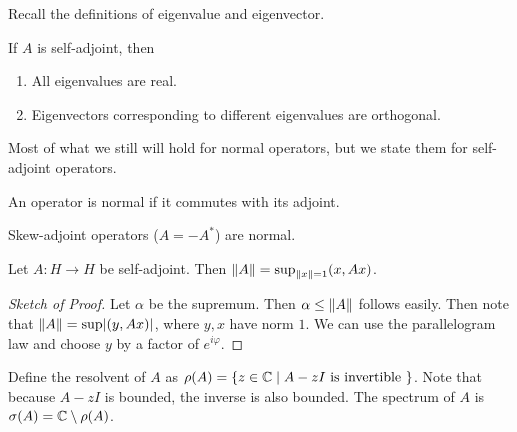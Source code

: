 \documentclass[10pt, twoside]{article}
\begin{document}
    Recall the definitions of eigenvalue and eigenvector.  \begin{prop} If $A$
    is self-adjoint, then \begin{enumerate} \item All eigenvalues are real.
    \item Eigenvectors corresponding to different eigenvalues are orthogonal.
\end{enumerate} \end{prop}

    Most of what we still will hold for normal operators, but we state them for
    self-adjoint operators.

    \begin{defn} An operator is normal if it commutes with its
    adjoint.  \end{defn}

    \begin{exm} Skew-adjoint operators ($A = -A^*$) are normal.  \end{exm}

    \begin{lem} Let $A:H \to H$ be self-adjoint. Then $\lVert A\rVert =
        \sup_{\lVert x\rVert = 1} (x,Ax)$.  \begin{proof}[Sketch of Proof] Let
            $\alpha$ be the supremum. Then $\alpha \leq \lVert A\rVert$ follows
            easily. Then note that $\lVert A\rVert = \sup \lvert(y,Ax)\rvert$, where $y,x$
            have norm $1$. We can use the parallelogram law and choose $y$ by a
            factor of $e^{i\varphi}$.  \end{proof} \end{lem}

    \begin{defn}[Resolvent] Define the resolvent of $A$ as $\rho(A) = \{z \in
        \mathbb{C} \mid A-zI \text{ is invertible } \}$.  Note that because $A-zI$ is
        bounded, the inverse is also bounded.  The spectrum of $A$ is
        $\sigma(A) = \mathbb{C} \setminus \rho(A)$.  \end{defn}
\end{document}
